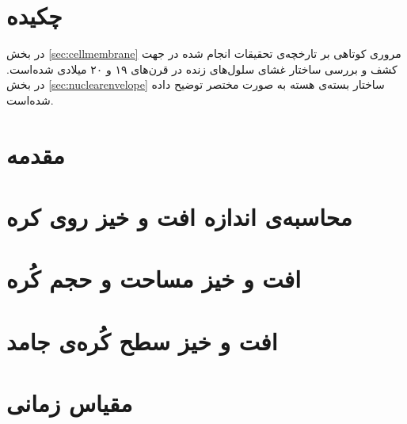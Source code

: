 \setRL
\clearpage
\def \MemFluc {\Mempath /MembraneFluc}

\section{
چکیده
}
در بخش
\ref{sec:cellmembrane}
مروری کوتاهی بر تارخچه‌ی تحقیقات انجام شده در جهت کشف و بررسی ساختار غشای سلول‌های زنده در قرن‌های ۱۹ و ۲۰ میلادی شده‌است. در بخش
\ref{sec:nuclearenvelope}
ساختار بسته‌ی هسته به صورت مختصر توضیح داده شده‌است.

\section{
مقدمه
}



\section{
محاسبه‌ی اندازه افت و خیز روی کره
\label{sec:bendingFluctuations}
}


\section{
افت و خیز مساحت و حجم کُره
}


\section{
افت و خیز سطح کُره‌ی جامد
}


\section{
مقیاس زمانی
}





